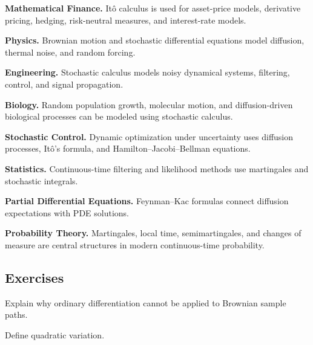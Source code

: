 \begin{applicationbox}

\textbf{Mathematical Finance.}
It\^o calculus is used for asset-price models, derivative pricing,
hedging, risk-neutral measures, and interest-rate models.

\medskip

\textbf{Physics.}
Brownian motion and stochastic differential equations model diffusion,
thermal noise, and random forcing.

\medskip

\textbf{Engineering.}
Stochastic calculus models noisy dynamical systems, filtering, control,
and signal propagation.

\medskip

\textbf{Biology.}
Random population growth, molecular motion, and diffusion-driven
biological processes can be modeled using stochastic calculus.

\medskip

\textbf{Stochastic Control.}
Dynamic optimization under uncertainty uses diffusion processes,
It\^o's formula, and Hamilton--Jacobi--Bellman equations.

\medskip

\textbf{Statistics.}
Continuous-time filtering and likelihood methods use martingales and
stochastic integrals.

\medskip

\textbf{Partial Differential Equations.}
Feynman--Kac formulas connect diffusion expectations with PDE solutions.

\medskip

\textbf{Probability Theory.}
Martingales, local time, semimartingales, and changes of measure are
central structures in modern continuous-time probability.

\end{applicationbox}

\subsection{Exercises}
\label{subsec:stochastic-calculus-exercises}

\begin{exercise}[1]
Explain why ordinary differentiation cannot be applied to Brownian
sample paths.
\end{exercise}

\begin{exercise}[1]
Define quadratic variation.
\end{exercise}

